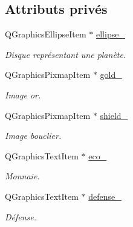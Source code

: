 \subsection*{Attributs privés}
\begin{DoxyCompactItemize}
\item 
\hypertarget{classQPlanet_a556a88605fa3b66ea40bf61d501694ea}{Q\-Graphics\-Ellipse\-Item $\ast$ \hyperlink{classQPlanet_a556a88605fa3b66ea40bf61d501694ea}{ellipse\-\_\-}}\label{classQPlanet_a556a88605fa3b66ea40bf61d501694ea}

\begin{DoxyCompactList}\small\item\em Disque représentant une planète. \end{DoxyCompactList}\item 
\hypertarget{classQPlanet_a2aa4365c333a36c393251cba7740a54f}{Q\-Graphics\-Pixmap\-Item $\ast$ \hyperlink{classQPlanet_a2aa4365c333a36c393251cba7740a54f}{gold\-\_\-}}\label{classQPlanet_a2aa4365c333a36c393251cba7740a54f}

\begin{DoxyCompactList}\small\item\em Image or. \end{DoxyCompactList}\item 
\hypertarget{classQPlanet_ad433ee49260de6bf067869dd77d5179c}{Q\-Graphics\-Pixmap\-Item $\ast$ \hyperlink{classQPlanet_ad433ee49260de6bf067869dd77d5179c}{shield\-\_\-}}\label{classQPlanet_ad433ee49260de6bf067869dd77d5179c}

\begin{DoxyCompactList}\small\item\em Image bouclier. \end{DoxyCompactList}\item 
\hypertarget{classQPlanet_a8065b7af3a05100f8d8c9b4eade528f4}{Q\-Graphics\-Text\-Item $\ast$ \hyperlink{classQPlanet_a8065b7af3a05100f8d8c9b4eade528f4}{eco\-\_\-}}\label{classQPlanet_a8065b7af3a05100f8d8c9b4eade528f4}

\begin{DoxyCompactList}\small\item\em Monnaie. \end{DoxyCompactList}\item 
\hypertarget{classQPlanet_aaf54cf59edd5942675b4f01a906bb2e0}{Q\-Graphics\-Text\-Item $\ast$ \hyperlink{classQPlanet_aaf54cf59edd5942675b4f01a906bb2e0}{defense\-\_\-}}\label{classQPlanet_aaf54cf59edd5942675b4f01a906bb2e0}

\begin{DoxyCompactList}\small\item\em Défense. \end{DoxyCompactList}\end{DoxyCompactItemize}


